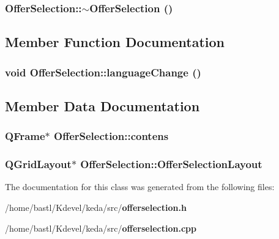 \subsubsection{\setlength{\rightskip}{0pt plus 5cm}Offer\-Selection::$\sim$Offer\-Selection ()}\label{classOfferSelection_0a6153d365807d5cfd7c48ead48a14ea}




\subsection{Member Function Documentation}
\subsubsection{\setlength{\rightskip}{0pt plus 5cm}void Offer\-Selection::language\-Change ()\hspace{0.3cm}{\tt  [protected, virtual, slot]}}\label{classOfferSelection_1182bf5637039731d24c9b1e622b4179}




\subsection{Member Data Documentation}
\subsubsection{\setlength{\rightskip}{0pt plus 5cm}QFrame$\ast$ {\bf Offer\-Selection::contens}}\label{classOfferSelection_700fb7c75e7c7f65a804d956d4c3d5f7}


\subsubsection{\setlength{\rightskip}{0pt plus 5cm}QGrid\-Layout$\ast$ {\bf Offer\-Selection::Offer\-Selection\-Layout}\hspace{0.3cm}{\tt  [protected]}}\label{classOfferSelection_699c9039c426a1a3b44adeb5f20900c2}




The documentation for this class was generated from the following files:\begin{CompactItemize}
\item 
/home/bastl/Kdevel/keda/src/{\bf offerselection.h}\item 
/home/bastl/Kdevel/keda/src/{\bf offerselection.cpp}\end{CompactItemize}
